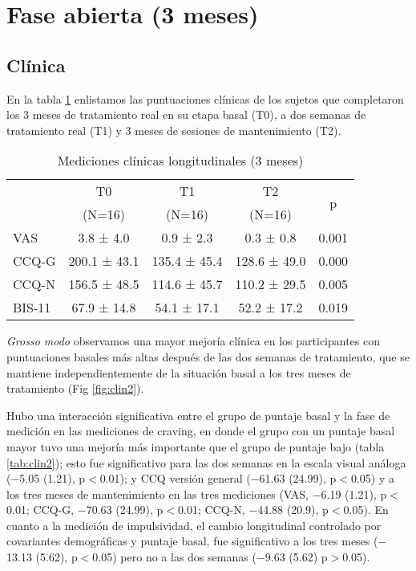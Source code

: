 \section{Fase abierta (3 meses)}
\subsection{Clínica}
En la tabla \ref{tab:cl2} enlistamos las puntuaciones clínicas de los sujetos que completaron los 3 meses de tratamiento real en su etapa basal (T0), a dos semanas de tratamiento real (T1) y 3 meses de sesiones de mantenimiento (T2).

\begin{table}[!ht]
    \centering
    \small
    \caption{Mediciones clínicas longitudinales (3 meses)}
    \label{tab:cl2}
\begin{tabular}{lcccc}
\hline
 & T0 & T1 & T2 & \multirow{2}{*}{p}\\
 & (N=16) & (N=16) & (N=16) &  \\
\hline
VAS   &  3.8 ±  4.0 &  0.9 ±  2.3 &  0.3 ±  0.8 & 0.001\\
CCQ-G  & 200.1 ± 43.1 & 135.4 ± 45.4 & 128.6 ± 49.0 & 0.000\\
CCQ-N  & 156.5 ± 48.5 & 114.6 ± 45.7 & 110.2 ± 29.5 & 0.005\\
BIS-11 & 67.9 ± 14.8 & 54.1 ± 17.1 & 52.2 ± 17.2 & 0.019\\
\hline
\end{tabular}
\end{table}

\textit{Grosso modo} observamos una mayor mejoría clínica en los participantes con puntuaciones basales más altas después de las dos semanas de tratamiento, que se mantiene independientemente de la situación basal a los tres meses de tratamiento (Fig \ref{fig:clin2}).\par
Hubo una interacción significativa entre el grupo de puntaje basal y la fase de medición en las mediciones de craving, en donde el grupo con un puntaje basal mayor tuvo una mejoría más importante que el grupo de puntaje bajo (tabla \ref{tab:clin2}); esto fue significativo para las dos semanas en la escala visual análoga ($-$5.05 (1.21), p$<$0.01); y CCQ versión general ($-$61.63 (24.99), p$<$0.05) y a los tres meses de mantenimiento  en las tres mediciones (VAS, $-$6.19 (1.21), p$<$0.01; CCQ-G, $-$70.63 (24.99), p$<$0.01; CCQ-N, $-$44.88 (20.9), p$<$0.05). En cuanto a la medición de impulsividad, el cambio longitudinal controlado por covariantes demográficas y puntaje basal, fue significativo a los tres meses ($-$13.13 (5.62), p$<$0.05) pero no a las dos semanas ($-$9.63 (5.62) p$>$0.05).

